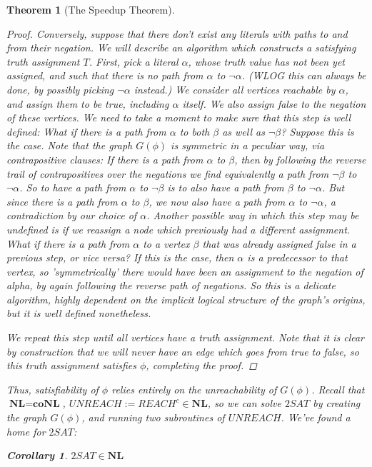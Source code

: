 \documentclass{article}
\theoremstyle{definition}
\theoremstyle{plain}
\theoremstyle{theorem}
\newtheorem{theorem}{Theorem}[section]
\newtheorem{corollary}{Corollary}[section]
\begin{document}
\begin{theorem}[The Speedup Theorem]
\begin{proof}
    \par Conversely, suppose that there don't exist any literals with paths to and from their negation. We will describe an algorithm which constructs a satisfying truth assignment $T$. First, pick a literal $\alpha$, whose truth value has not been yet assigned, and such that there is no path from $\alpha$ to $\neg \alpha$. (WLOG this can always be done, by possibly picking $\neg \alpha$ instead.) We consider all vertices reachable by $\alpha$, and assign them to be true, including $\alpha$ itself. We also assign false to the negation of these vertices. We need to take a moment to make sure that this step is well defined: What if there is a path from $\alpha$ to both $\beta$ as well as $\neg \beta$? Suppose this is the case. Note that the graph $G(\phi)$ is symmetric in a peculiar way, via contrapositive clauses: If there is a path from $\alpha$ to $\beta$, then by following the reverse trail of contrapositives over the negations we find equivalently a path from $\neg \beta$ to $\neg \alpha$. So to have a path from $\alpha$ to $\neg \beta$ is to also have a path from $\beta$ to $\neg \alpha$. But since there is a path from $\alpha$ to $\beta$, we now also have a path from $\alpha$ to $\neg \alpha$, a contradiction by our choice of $\alpha$. Another possible way in which this step may be undefined is if we reassign a node which previously had a different assignment. What if there is a path from $\alpha$ to a vertex $\beta$ that was already assigned false in a previous step, or vice versa? If this is the case, then $\alpha$ is a predecessor to that vertex, so 'symmetrically' there would have been an assignment to the negation of alpha, by again following the reverse path of negations. So this is a delicate algorithm, highly dependent on the implicit logical structure of the graph's origins, but it is well defined nonetheless.
    \par We repeat this step until all vertices have a truth assignment. Note that it is clear by construction that we will never have an edge which goes from true to false, so this truth assignment satisfies $\phi$, completing the proof.
\end{proof}
    Thus, satisfiability of $\phi$ relies entirely on the \textit{unreachability} of $G(\phi)$. Recall that $\textbf{NL} = \textbf{coNL}$, $UNREACH := REACH^c \in \textbf{NL}$, so we can solve $2SAT$ by creating the graph $G(\phi)$, and running two subroutines of $UNREACH$. We've found a home for $2SAT$: 
\begin{corollary}
    $2SAT \in \textbf{NL}$

\end{corollary}
\end{theorem}
\end{document}
